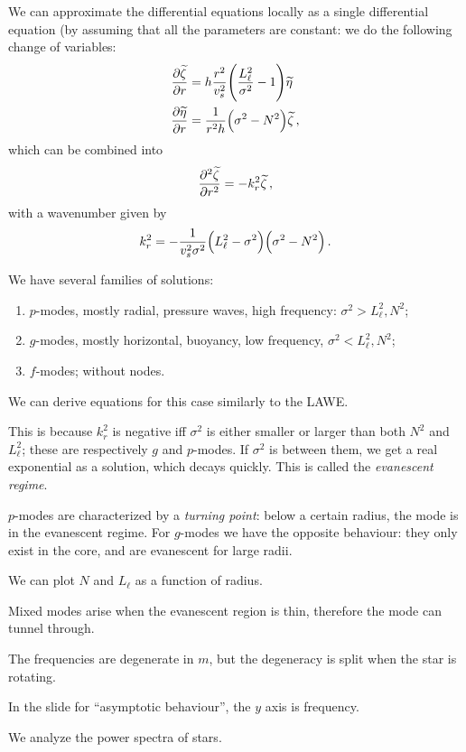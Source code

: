 \documentclass[main.tex]{subfiles}
\begin{document}
We can approximate the differential equations locally as a single differential equation (by assuming that all the parameters are constant: we do the following change of variables: 
%
\begin{align}
\pdv{\widetilde{\zeta}}{r} &= h \frac{r^2}{v_s^2} \qty(\frac{L_{\ell}^2}{\sigma^2}  -1 )\widetilde{\eta}  \\
\pdv{\widetilde{\eta}}{r} &= \frac{1}{r^2h} \qty(\sigma^2-N^2) \widetilde{\zeta}
\,,
\end{align}
%
which can be combined into 
%
\begin{align}
\pdv[2]{\widetilde{\zeta}}{r} = - k_r^2 \widetilde{\zeta}
\,,
\end{align}
%
with a wavenumber given by
%
\begin{equation}
  k^2_r = - \frac{1}{v_s^2 \sigma^2 } \qty(L_\ell^2- \sigma^2   ) \qty(\sigma^2 - N^2)
  \,.
\end{equation}

We have several families of solutions: 

\begin{enumerate}
    \item \(p\)-modes, mostly radial, pressure waves, high frequency: \(\sigma^2> L^2_{\ell}, N^2\);
    \item \(g\)-modes, mostly horizontal, buoyancy, low frequency, \(\sigma^2 < L^2_{\ell}, N^2\);
    \item \(f\)-modes; without nodes.
\end{enumerate}

We can derive equations for this case similarly to the LAWE.


This is because \(k_r^2\) is negative iff \(\sigma^2\) is either smaller or larger than both \(N^2\) and \(L_\ell^2\); these are respectively \(g\) and \(p\)-modes. If \(\sigma^2\) is between them, we get a real exponential as a solution, which decays quickly.
This is called the \emph{evanescent regime}.

\(p\)-modes are characterized by a \emph{turning point}: below a certain radius, the mode is in the evanescent regime.
For \(g\)-modes we have the opposite behaviour: they only exist in the core, and are evanescent for large radii. 

We can plot \(N\) and \(L_\ell\) as a function of radius.

Mixed modes arise when the evanescent region is thin, therefore the mode can tunnel through.

The frequencies are degenerate in \(m\), but the degeneracy is split when the star is rotating.

In the slide for ``asymptotic behaviour'', the \(y\) axis is frequency.

We analyze the power spectra of stars.
\end{document}
